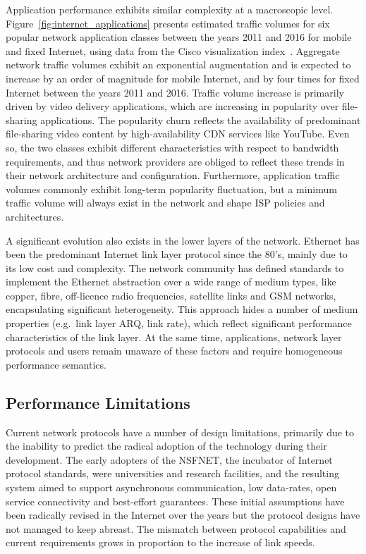 Application performance exhibits similar complexity at a macroscopic level.
Figure~\ref{fig:internet_applications} presents estimated traffic volumes for
six popular network application classes between the years 2011 and 2016 for mobile
and fixed Internet, using data from the Cisco visualization
index~. Aggregate network traffic volumes
exhibit an exponential augmentation and is expected to increase by an order of
magnitude for mobile Internet, and by four times for fixed Internet between the
years 2011 and 2016. Traffic volume increase is primarily driven by video
delivery applications, which are increasing in popularity over file-sharing
applications. The popularity churn reflects the availability of predominant
file-sharing video content by high-availability CDN services like YouTube.
Even so, the two classes exhibit different characteristics with respect to
bandwidth requirements, and thus network providers are obliged to reflect these
trends in their network architecture and configuration. Furthermore,
application traffic volumes commonly exhibit long-term popularity fluctuation,
but a minimum traffic volume will always exist in the network and shape ISP
policies and architectures. 

A significant evolution also exists in the lower layers of the network.
Ethernet has been the predominant Internet link layer protocol since the 80's,
mainly due to its low cost and complexity. The network community has defined
standards to implement the Ethernet abstraction over a wide range of medium
types, like copper, fibre, off-licence radio frequencies, satellite links and
GSM networks, encapsulating significant heterogeneity. This approach hides a
number of medium properties (e.g.~link layer ARQ, link rate), which reflect
significant performance characteristics of the link layer. At the same time,
applications, network layer protocols and users remain unaware of these factors
and require homogeneous performance semantics. 

\subsection{Performance Limitations}\label{sec:intro:control_limitations}

Current network protocols have a number of design limitations, primarily
due to the inability to predict the radical adoption of the technology during
their development.  The early adopters of the NSFNET, the incubator  of
Internet protocol standards, were universities and research facilities, and the
resulting system aimed to support asynchronous communication, low data-rates,
open service connectivity and best-effort guarantees. These initial assumptions
have been radically revised in the Internet over the years but the protocol
designs have not managed to keep abreast. The mismatch between
protocol capabilities and current requirements grows in proportion to the
increase of link speeds.

